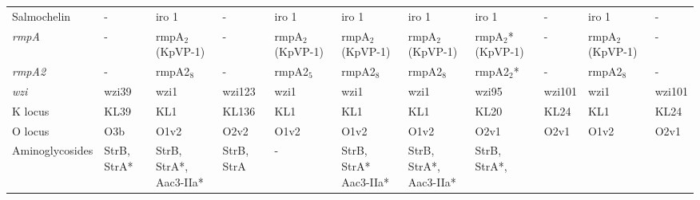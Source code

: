 \begin{table}
\begin{threeparttable}
\begin{tabular}{lllllllllll}
            Salmochelin &               - &                            iro 1 &             - &            iro 1 &                 iro 1 &                 iro 1 &                            iro 1 &                - &                            iro 1 &                - \\
          \textit{rmpA} &               - &                 rmpA$_2$(KpVP-1) &             - & rmpA$_2$(KpVP-1) &      rmpA$_2$(KpVP-1) &      rmpA$_2$(KpVP-1) &                rmpA$_2$*(KpVP-1) &                - &                 rmpA$_2$(KpVP-1) &                - \\
         \textit{rmpA2} &               - &                        rmpA2$_8$ &             - &        rmpA2$_5$ &             rmpA2$_8$ &             rmpA2$_8$ &                       rmpA2$_2$* &                - &                        rmpA2$_8$ &                - \\
           \textit{wzi} &           wzi39 &                             wzi1 &        wzi123 &             wzi1 &                  wzi1 &                  wzi1 &                            wzi95 &           wzi101 &                             wzi1 &           wzi101 \\
                K locus &            KL39 &                              KL1 &         KL136 &              KL1 &                   KL1 &                   KL1 &                             KL20 &             KL24 &                              KL1 &             KL24 \\
                O locus &             O3b &                             O1v2 &          O2v2 &             O1v2 &                  O1v2 &                  O1v2 &                             O2v1 &             O2v1 &                             O1v2 &             O2v1 \\
        Aminoglycosides &      StrB, StrA* &               \mCL{StrB, StrA*, \\
                                                                  Aac3-IIa*} &    StrB, StrA &                - &     \mCL{StrB, StrA*\\
                                                                                                                             Aac3-IIa*} &     \mCL{StrB, StrA*, \\
                                                                                                                                                     Aac3-IIa*} &               \mCL{StrB, StrA*, \\
}
\end{tabular}
\end{threeparttable}
\end{table}
